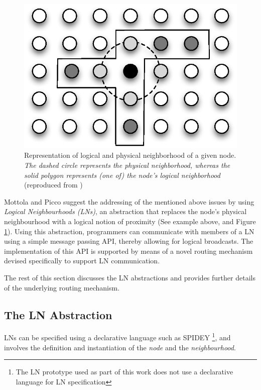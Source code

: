 \begin{figure} 
\centering
\includegraphics[scale=0.71]{img/LN_physical_vs_logical.eps} 
\caption[Difference between physical and logical neighborhoods]{Representation 
of logical and physical neighborhood of a given node. \emph{The dashed circle 
represents the physical neighborhood, whereas the solid polygon represents (one 
of) the node's logical neighborhood} (reproduced from
\cite{mottola_LN:2006})}
\label{Fig:LN_physical_vs_logical}
\end{figure} 

Mottola and Picco \cite{mottola_LN:2006} suggest the addressing of the
mentioned above issues by using \emph{Logical Neighbourhoods (LNs)}, an
abstraction that replaces the node's physical neighbourhood with a logical notion of
proximity (See example above, and Figure \ref{Fig:LN_physical_vs_logical}). Using this abstraction, programmers
can communicate
with members of a LN using a simple message passing API,
thereby allowing for logical broadcasts. The implementation of this API is
supported by means of a novel routing mechanism devised specifically to support
LN communication.


The rest of this section discusses the LN abstractions and provides further
details of the underlying routing mechanism.

\subsection{The LN Abstraction}

LNs can be specified using a declarative language such as SPIDEY
\cite{mottola_LN:2006, mottola_LNScoping:2006}\footnote{The LN prototype used as
part of this work does not use a declarative language for LN specification}, and
involves the definition and instantiation of the \emph{node} and the
\emph{neighbourhood}. 

